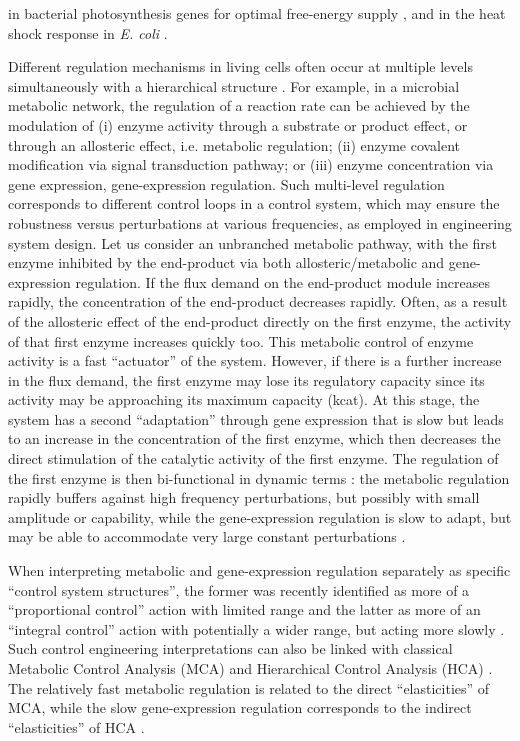 in bacterial photosynthesis genes for optimal free-energy supply \cite{mank_mixed_2013}, and in the heat shock response in \textit{E. coli} \cite{shudo_optimal_2003}.

Different regulation mechanisms in living cells often occur at multiple levels simultaneously with a hierarchical structure \cite{westerhoff_signalling_2008}. For example, in a microbial metabolic network, the regulation of a reaction rate can be achieved by the modulation of (i) enzyme activity through a substrate or product effect, or through an allosteric effect, i.e. metabolic regulation; (ii) enzyme covalent modification via signal transduction pathway; or (iii) enzyme concentration via gene expression, gene-expression regulation. Such multi-level regulation corresponds to different control loops in a control system, which may ensure the robustness versus perturbations at various frequencies, as employed in engineering system design. Let us consider an unbranched metabolic pathway, with the first enzyme inhibited by the end-product via both allosteric/metabolic and gene-expression regulation. If the flux demand on the end-product module increases rapidly, the concentration of the end-product decreases rapidly. Often, as a result of the allosteric effect of the end-product directly on the first enzyme, the activity of that first enzyme increases quickly too. This metabolic control of enzyme activity is a fast “actuator” of the system. However, if there is a further increase in the flux demand, the first enzyme may lose its regulatory capacity since its activity may be approaching its maximum capacity (kcat). At this stage, the system has a second “adaptation” through gene expression that is slow but leads to an increase in the concentration of the first enzyme, which then decreases the direct stimulation of the catalytic activity of the first enzyme. The regulation of the first enzyme is then bi-functional in dynamic terms \cite{csete_reverse_2002}: the metabolic regulation rapidly buffers against high frequency perturbations, but possibly with small amplitude or capability, while the gene-expression regulation is slow to adapt, but may be able to accommodate very large constant perturbations \cite{ter_kuile_transcriptome_2001}.

When interpreting metabolic and gene-expression regulation separately as specific ``control system structures'', the former was recently identified as more of a ``proportional control'' action \cite{yi_robust_2000,el-samad_calcium_2002} with limited range and the latter as more of an ``integral control'' action with potentially a wider range, but acting more slowly \cite{he_imperfect_2013}. Such control engineering interpretations can also be linked with classical Metabolic Control Analysis (MCA) \cite{fell_understanding_1996} and Hierarchical Control Analysis (HCA) \cite{kahn_control_1991}. The relatively fast metabolic regulation is related to the direct ``elasticities'' of MCA, while the slow gene-expression regulation corresponds to the indirect ``elasticities'' of HCA \cite{he_imperfect_2013}.

